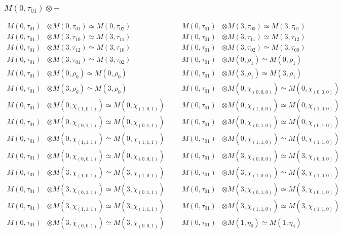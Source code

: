 \subsubsection{$ M(0,\tau_{01})\otimes -$}
\begin{align*}
M(0,\tau_{01}) &\otimes M(0,\tau_{01}) \simeq M(0,\tau_{02}) &&& M(0,\tau_{01}) &\otimes M(3,\tau_{00}) \simeq M(3,\tau_{01})\\
M(0,\tau_{01}) &\otimes M(3,\tau_{10}) \simeq M(3,\tau_{11}) &&& M(0,\tau_{01}) &\otimes M(3,\tau_{11}) \simeq M(3,\tau_{12})\\
M(0,\tau_{01}) &\otimes M(3,\tau_{12}) \simeq M(3,\tau_{10}) &&& M(0,\tau_{01}) &\otimes M(3,\tau_{02}) \simeq M(3,\tau_{00})\\
M(0,\tau_{01}) &\otimes M(3,\tau_{01}) \simeq M(3,\tau_{02}) &&& M(0,\tau_{01}) &\otimes M(0,\rho_{1}) \simeq M(0,\rho_{1})\\
M(0,\tau_{01}) &\otimes M(0,\rho_{0}) \simeq M(0,\rho_{0}) &&& M(0,\tau_{01}) &\otimes M(3,\rho_{1}) \simeq M(3,\rho_{1})\\
M(0,\tau_{01}) &\otimes M(3,\rho_{0}) \simeq M(3,\rho_{0}) &&& M(0,\tau_{01}) &\otimes M(0,\chi_{(0,0,0)}) \simeq M(0,\chi_{(0,0,0)})\\
M(0,\tau_{01}) &\otimes M(0,\chi_{(1,0,1)}) \simeq M(0,\chi_{(1,0,1)}) &&& M(0,\tau_{01}) &\otimes M(0,\chi_{(1,0,0)}) \simeq M(0,\chi_{(1,0,0)})\\
M(0,\tau_{01}) &\otimes M(0,\chi_{(0,1,1)}) \simeq M(0,\chi_{(0,1,1)}) &&& M(0,\tau_{01}) &\otimes M(0,\chi_{(0,1,0)}) \simeq M(0,\chi_{(0,1,0)})\\
M(0,\tau_{01}) &\otimes M(0,\chi_{(1,1,1)}) \simeq M(0,\chi_{(1,1,1)}) &&& M(0,\tau_{01}) &\otimes M(0,\chi_{(1,1,0)}) \simeq M(0,\chi_{(1,1,0)})\\
M(0,\tau_{01}) &\otimes M(0,\chi_{(0,0,1)}) \simeq M(0,\chi_{(0,0,1)}) &&& M(0,\tau_{01}) &\otimes M(3,\chi_{(0,0,0)}) \simeq M(3,\chi_{(0,0,0)})\\
M(0,\tau_{01}) &\otimes M(3,\chi_{(1,0,1)}) \simeq M(3,\chi_{(1,0,1)}) &&& M(0,\tau_{01}) &\otimes M(3,\chi_{(1,0,0)}) \simeq M(3,\chi_{(1,0,0)})\\
M(0,\tau_{01}) &\otimes M(3,\chi_{(0,1,1)}) \simeq M(3,\chi_{(0,1,1)}) &&& M(0,\tau_{01}) &\otimes M(3,\chi_{(0,1,0)}) \simeq M(3,\chi_{(0,1,0)})\\
M(0,\tau_{01}) &\otimes M(3,\chi_{(1,1,1)}) \simeq M(3,\chi_{(1,1,1)}) &&& M(0,\tau_{01}) &\otimes M(3,\chi_{(1,1,0)}) \simeq M(3,\chi_{(1,1,0)})\\
M(0,\tau_{01}) &\otimes M(3,\chi_{(0,0,1)}) \simeq M(3,\chi_{(0,0,1)}) &&& M(0,\tau_{01}) &\otimes M(1,\eta_{0}) \simeq M(1,\eta_{4})\\

\end{align*}
